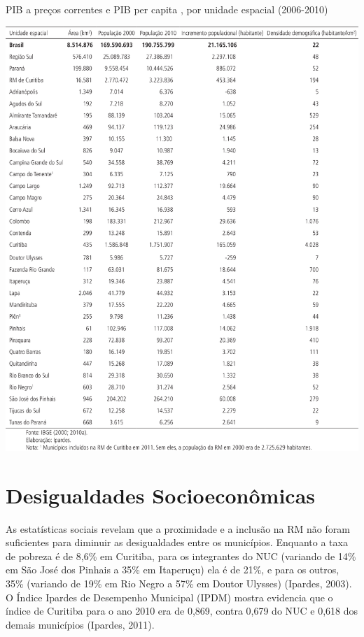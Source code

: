 	\begin{table}
		\centering
		\caption{PIB a preços correntes e PIB per capita , por unidade espacial (2006-2010)}
		\includegraphics[width=1.0\linewidth]{img/costa2015a_10}
		\label{tab:costa2015a_10}
	\end{table}
	
	\section{Desigualdades Socioeconômicas}
	
	As estatísticas sociais revelam que a proximidade e a inclusão na RM não foram suficientes para diminuir as desigualdades entre os municípios. Enquanto a taxa de pobreza é de 8,6\% em Curitiba, para os integrantes do NUC (variando de 14\% em São José dos Pinhais a 35\% em Itaperuçu) ela é de 21\%, e para os outros, 35\% (variando de 19\% em Rio Negro a 57\% em Doutor Ulysses) (Ipardes, 2003). O Índice Ipardes de Desempenho Municipal (IPDM) mostra evidencia que o índice de Curitiba para o ano 2010 era de 0,869, contra 0,679 do NUC e 0,618 dos demais municípios (Ipardes, 2011).

